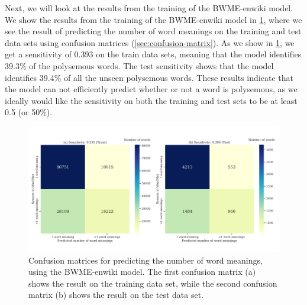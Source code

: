 Next, we will look at the results from the training of the BWME-enwiki model. We show the results from the training of the BWME-enwiki model in \cref{fig:bwme-enwiki-confusion-matrices}, where we see the result of predicting the number of word meanings on the training and test data sets using confusion matrices (\cref{sec:confusion-matrix}). As we show in \cref{fig:bwme-enwiki-confusion-matrices}, we get a sensitivity of 0.393 on the train data sets, meaning that the model identifies 39.3\% of the polysemous words. The test sensitivity shows that the model identifies 39.4\% of all the unseen polysemous words. These results indicate that the model can not efficiently predict whether or not a word is polysemous, as we ideally would like the sensitivity on both the training and test sets to be at least 0.5 (or 50\%).
\begin{figure}[H]
    \centering
    \includegraphics[width=\textwidth]{thesis/figures/bwme-enwiki-confusion-matrices.pdf}
    \caption{Confusion matrices for predicting the number of word meanings, using the BWME-enwiki model. The first confusion matrix (a) shows the result on the training data set, while the second confusion matrix (b) shows the result on the test data set.}
    \label{fig:bwme-enwiki-confusion-matrices}
\end{figure}

